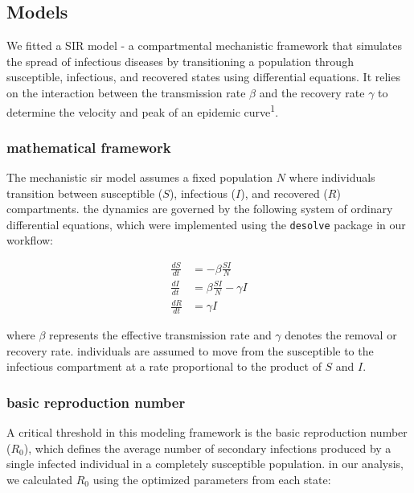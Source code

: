\documentclass[
  letterpaper,
  DIV=11,
  numbers=noendperiod]{scrartcl}
\begin{document}
\subsection{Models}\label{models}

We fitted a SIR model - a compartmental mechanistic framework that
simulates the spread of infectious diseases by transitioning a
population through susceptible, infectious, and recovered states using
differential equations. It relies on the interaction between the
transmission rate \(\beta\) and the recovery rate \(\gamma\) to
determine the velocity and peak of an epidemic curve\textsuperscript{1}.

\subsubsection{mathematical framework}\label{mathematical-framework}

The mechanistic sir model assumes a fixed population \(N\) where
individuals transition between susceptible (\(S\)), infectious (\(I\)),
and recovered (\(R\)) compartments. the dynamics are governed by the
following system of ordinary differential equations, which were
implemented using the \texttt{desolve} package in our workflow:

\[\begin{aligned}
\frac{dS}{dt} &= -\beta \frac{S I}{N} \\
\frac{dI}{dt} &= \beta \frac{S I}{N} - \gamma I \\
\frac{dR}{dt} &= \gamma I
\end{aligned}\]

where \(\beta\) represents the effective transmission rate and
\(\gamma\) denotes the removal or recovery rate. individuals are assumed
to move from the susceptible to the infectious compartment at a rate
proportional to the product of \(S\) and \(I\).

\subsubsection{basic reproduction
number}\label{basic-reproduction-number}

A critical threshold in this modeling framework is the basic
reproduction number (\(R_0\)), which defines the average number of
secondary infections produced by a single infected individual in a
completely susceptible population. in our analysis, we calculated
\(R_0\) using the optimized parameters from each state:
\end{document}
